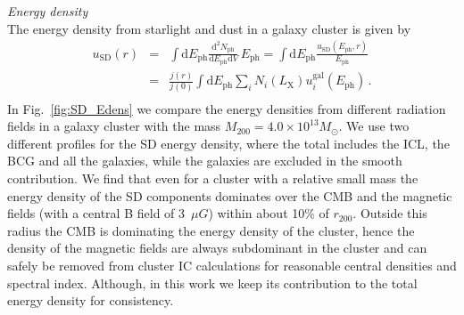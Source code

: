 \documentclass[10pt,aps,pra,reprint,amsmath,amsfonts,amssymb,showpacs]{revtex4-1}
\newcommand{\rmn}{\mathrm}
\newcommand{\ph}{\rmn{ph}}
\newcommand{\eph}{E_\ph}
\newcommand{\gal}{\rmn{gal}}
\newcommand{\sd}{\rmn{SD}}
\newcommand{\msun}{M_\odot}
\newcommand{\lx}{L_\rmn{X}}
\newcommand{\dd}{\rmn{d}}
\newcommand{\rvir}{r_{200}}
\newcommand{\mvir}{M_{200}}
\begin{document}
{\it Energy density}\\ The energy density from starlight and dust in
a galaxy cluster is given by
\begin{eqnarray}
\label{eq:U_SD}
u_\sd(r) &=& \int \dd \eph \frac{\dd^2 N_\ph}{\dd \eph \dd V}\,\eph
=\int \dd \eph \frac{u_\sd(\eph, r)}{\eph}
\nonumber \\
&=&  \frac{j(r)}{j(0)} \int \dd \eph \sum_i 
N_i(\lx) u_i^\gal(\eph)\,. \nonumber \\
\end{eqnarray}
In Fig.~\ref{fig:SD_Edens} we compare the energy densities from
different radiation fields in a galaxy cluster with the mass
$\mvir=4.0\times10^{13}\msun$. We use two different profiles for the
SD energy density, where the total includes the ICL, the BCG and all
the galaxies, while the galaxies are excluded in the smooth
contribution. We find that even for a cluster with a relative small
mass the energy density of the SD components dominates over the CMB
and the magnetic fields (with a central B field of 3~$\mu G$) within
about 10\% of $\rvir$. Outside this radius the CMB is dominating the
energy density of the cluster, hence the density of the magnetic
fields are always subdominant in the cluster and can safely be removed
from cluster IC calculations for reasonable central densities and
spectral index. Although, in this work we keep its contribution to the
total energy density for consistency.
\end{document}
